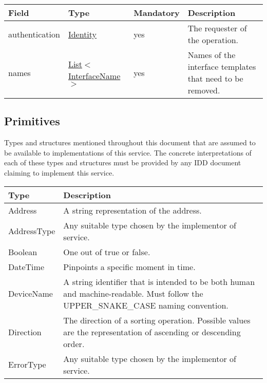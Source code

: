 \documentclass[a4paper]{arrowhead}
\newcommand{\pdef}[1]{{\textcolor{ArrowheadGrey}{#1\label{sec:model:primitives:#1}\label{sec:model:primitives:#1s}\label{sec:model:primitives:#1es}}}}
\newcommand{\pref}[1]{{\textcolor{ArrowheadGrey}{\hyperref[sec:model:primitives:#1]{#1}}}}
\begin{document}

\begin{table}[ht!]
\begin{tabularx}{\textwidth}{| p{2.5cm} | p{3.8cm} | p{2cm} | X |} \hline
\rowcolor{gray!33} Field & Type & Mandatory & Description \\ \hline
authentication & \hyperref[sec:model:Identity]{Identity} & yes & The requester of the operation. \\ \hline
names &  \pref{List}$<$\pref{InterfaceName}$>$ & yes & Names of the interface templates that need to be removed. \\ \hline
\end{tabularx}
\end{table}

\subsection{Primitives}
\label{sec:model:primitives}

Types and structures mentioned throughout this document that are assumed to be available to implementations of this service.
The concrete interpretations of each of these types and structures must be provided by any IDD document claiming to implement this service.

\begin{table}[ht!]
\begin{tabularx}{\textwidth}{| p{3cm} | X |} \hline
\rowcolor{gray!33} Type & Description \\ \hline
\pdef{Address}          & A string representation of the address. \\ \hline
\pdef{AddressType}      & Any suitable type chosen by the implementor of service. \\ \hline
\pdef{Boolean}          & One out of true or false. \\ \hline
\pdef{DateTime}         & Pinpoints a specific moment in time. \\ \hline
\pdef{DeviceName}       & A string identifier that is intended to be both human and machine-readable. Must follow the UPPER\_SNAKE\_CASE naming convention. \\ \hline
\pdef{Direction}        & The direction of a sorting operation. Possible values are the representation of ascending or descending order. \\ \hline
\pdef{ErrorType}        & Any suitable type chosen by the implementor of service. \\ \hline
\end{tabularx}
\end{table}
\end{document}
